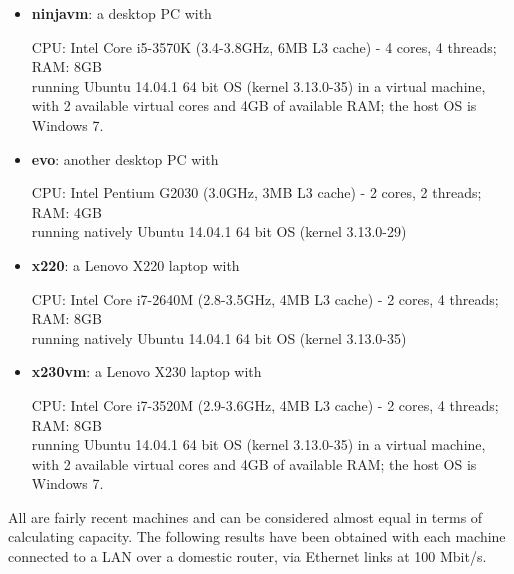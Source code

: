 \documentclass[a4paper, 11pt, oneside]{duthesis}
\begin{document}
\begin{itemize}

\item \textbf{ninjavm}: a desktop PC with 

CPU: Intel Core i5-3570K (3.4-3.8GHz, 6MB L3 cache) - 4 cores, 4 threads;\\
RAM: 8GB\\
running Ubuntu 14.04.1 64 bit OS (kernel 3.13.0-35) in a virtual machine, with 2 available virtual cores and 4GB of available RAM; the host OS is Windows 7.

\item \textbf{evo}: another desktop PC with

CPU: Intel Pentium G2030 (3.0GHz, 3MB L3 cache) - 2 cores, 2 threads;\\
RAM: 4GB\\
running natively Ubuntu 14.04.1 64 bit OS (kernel 3.13.0-29)

\item \textbf{x220}: a Lenovo X220 laptop with

CPU: Intel Core i7-2640M (2.8-3.5GHz, 4MB L3 cache) - 2 cores, 4 threads;\\
RAM: 8GB\\
running natively Ubuntu 14.04.1 64 bit OS (kernel 3.13.0-35)


\item \textbf{x230vm}: a Lenovo X230 laptop with

CPU: Intel Core i7-3520M (2.9-3.6GHz, 4MB L3 cache) - 2 cores, 4 threads;\\
RAM: 8GB\\
running Ubuntu 14.04.1 64 bit OS (kernel 3.13.0-35) in a virtual machine, with 2 available virtual cores and 4GB of available RAM; the host OS is Windows 7.

\end{itemize}

All are fairly recent machines and can be considered almost equal in terms of calculating capacity.
The following results have been obtained with each machine connected to a LAN over a domestic router, via Ethernet links at 100 Mbit/s.

\newpage
\end{document}
